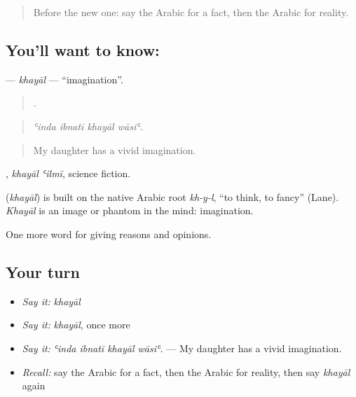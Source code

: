 \label{lesson:AR-C365-khayal}



\begin{quote}
Before the new one: say the Arabic for a fact, then the Arabic for reality.
\end{quote}

\subsection*{You'll want to know: }
\textbf{} — \emph{khayāl} — \textquotedblleft{}imagination\textquotedblright{}.

\begin{quote}
   .
\end{quote}

\begin{quote}
\emph{ʿinda ibnatī khayāl wāsiʿ.}
\end{quote}

\begin{quote}
My daughter has a vivid imagination.
\end{quote}

 , \emph{khayāl ʿilmī}, science fiction.

\begin{cousinweb}
\textbf{} (\emph{khayāl}) is built on the native Arabic root \emph{kh-y-l}, \textquotedblleft{}to think, to fancy\textquotedblright{} (Lane). \emph{Khayāl} is an image or phantom in the mind: imagination.
\end{cousinweb}

\begin{grammarlens}[title={What you've built}]
One more word for giving reasons and opinions.
\end{grammarlens}

\subsection*{Your turn}
\begin{itemize}
\raggedright
  \item \emph{Say it:} \emph{khayāl}
  \item \emph{Say it:} \emph{khayāl}, once more
  \item \emph{Say it:} \emph{ʿinda ibnatī khayāl wāsiʿ.} — My daughter has a vivid imagination.
  \item \emph{Recall:} say the Arabic for a fact, then the Arabic for reality, then say \emph{khayāl} again
\end{itemize}

